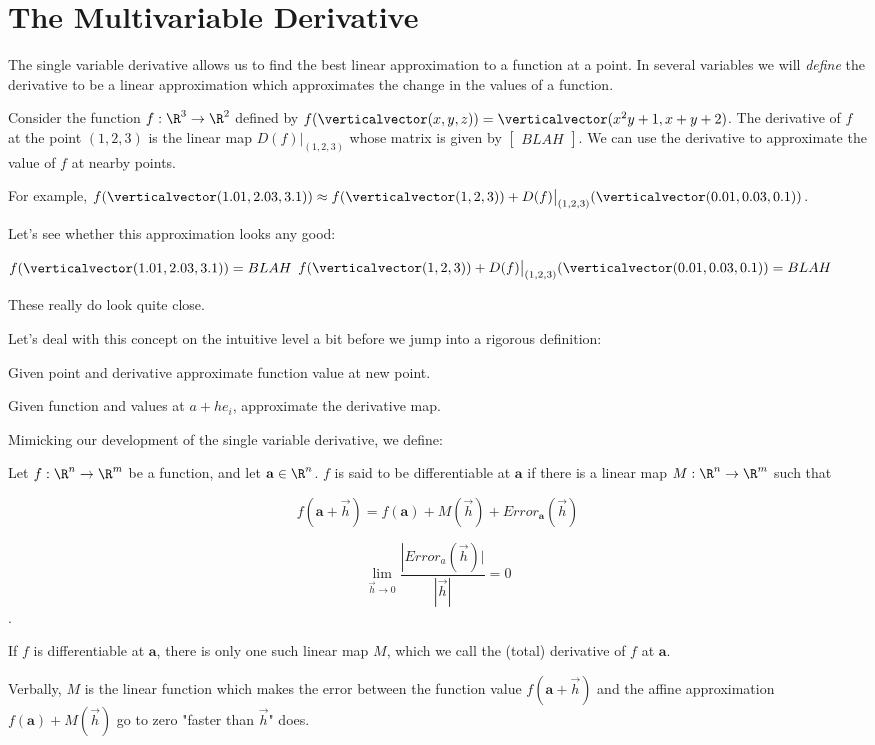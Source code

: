 
\section{The Multivariable Derivative}

The single variable derivative allows us to find the best linear approximation to a function at a point.  In several variables we will \textit{define} 
the derivative to be a linear approximation which approximates the change in the values of a function.

\begin{example}
	Consider the function $f:\R^3 \to \R^2$ defined by $f(\verticalvector(x,y,z)) = \verticalvector(x^2y+1,x+y+2)$.  The derivative of $f$ at the point $(1,2,3)$ is the 
	linear map $D(f)\big|_{(1,2,3)}$ whose matrix is given by $\begin{bmatrix} BLAH \end{bmatrix}$.  We can use the derivative to approximate the value of $f$ at nearby points.
	
	For example, $f(\verticalvector(1.01,2.03,3.1)) \approx f(\verticalvector(1,2,3))+ D(f)\big|_{(1,2,3)}(\verticalvector(0.01,0.03,0.1))$.
	
	Let's see whether this approximation looks any good:
	
	$f(\verticalvector(1.01,2.03,3.1))  = BLAH$
	$ f(\verticalvector(1,2,3))+ D(f)\big|_{(1,2,3)}(\verticalvector(0.01,0.03,0.1)) = BLAH$
	
	These really do look quite close.
\end{example}

Let's deal with this concept on the intuitive level a bit before we jump into a rigorous definition:

\begin{question}
	Given point and derivative approximate function value at new point.
\end{question}

\begin{question}
	Given function and values at $a+he_i$, approximate the derivative map.
\end{question}

Mimicking our development of the single variable derivative, we define:

\begin{definition}
	Let $f :\R^n \to \R^m$ be a function, and let $\mathbf{a} \in \R^n$.  
	 $f$ is said to be differentiable at $\mathbf{a}$ if there is a linear map $M:\R^n \to \R^m$ such that 
		
		\[ f(\mathbf{a}+\vec{h}) = f(\mathbf{a}) + M(\vec{h})+ Error_{\mathbf{a}}(\vec{h})\]
		
		\[ \lim_{\vec{h} \to 0} \frac{\left|Error_a(\vec{h})|}{\left|\vec{h}\right|} = 0 \].
		
		If $f$ is differentiable at $\mathbf{a}$, there is only one such linear map $M$, which we call the (total) derivative of $f$ at $\mathbf{a}$.  
		
		Verbally,  $M$ is the linear function which makes the error between the function value $f(\mathbf{a}+\vec{h})$ and the affine approximation 
		$f(\mathbf{a})+M(\vec{h})$ go to zero "faster than $\vec{h}$" does.
\end{definition}

